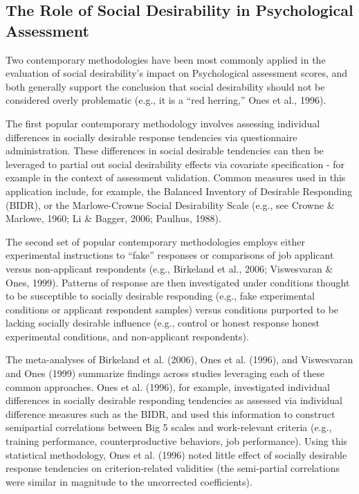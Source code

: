 \documentclass[
  ,jou]{apa6}
\begin{document}
\hypertarget{the-role-of-social-desirability-in-psychological-assessment}{%
\subsection{The Role of Social Desirability in Psychological Assessment}\label{the-role-of-social-desirability-in-psychological-assessment}}

Two contemporary methodologies have been most commonly applied in the evaluation of social desirability's impact on Psychological assessment scores, and both generally support the conclusion that social desirability should not be considered overly problematic (e.g., it is a ``red herring,'' Ones et al., 1996).

The first popular contemporary methodology involves assessing individual differences in socially desirable response tendencies via questionnaire administration. These differences in social desirable tendencies can then be leveraged to partial out social desirability effects via covariate specification - for example in the context of assessment validation. Common measures used in this application include, for example, the Balanced Inventory of Desirable Responding (BIDR), or the Marlowe-Crowne Social Desirability Scale (e.g., see Crowne \& Marlowe, 1960; Li \& Bagger, 2006; Paulhus, 1988).

The second set of popular contemporary methodologies employs either experimental instructions to ``fake'' responses or comparisons of job applicant versus non-applicant respondents (e.g., Birkeland et al., 2006; Viswesvaran \& Ones, 1999). Patterns of response are then investigated under conditions thought to be susceptible to socially desirable responding (e.g., fake experimental conditions or applicant respondent samples) versus conditions purported to be lacking socially desirable influence (e.g., control or honest response honest experimental conditions, and non-applicant respondents).

The meta-analyses of Birkeland et al. (2006), Ones et al. (1996), and Viswesvaran and Ones (1999) summarize findings across studies leveraging each of these common approaches. Ones et al. (1996), for example, investigated individual differences in socially desirable responding tendencies as assessed via individual difference measures such as the BIDR, and used this information to construct semipartial correlations between Big 5 scales and work-relevant criteria (e.g., training performance, counterproductive behaviors, job performance). Using this statistical methodology, Ones et al. (1996) noted little effect of socially desirable response tendencies on criterion-related validities (the semi-partial correlations were similar in magnitude to the uncorrected coefficients).
\end{document}
